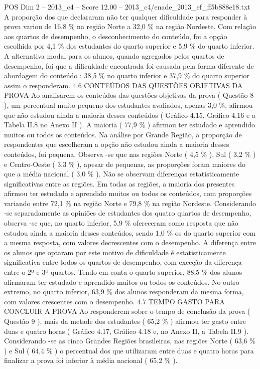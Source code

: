 \begin{textsample}{POS Dim 2 – 2013\_c4 – Score 12.00 – 2013\_c4/enade\_2013\_ef\_ff5b888e18.txt}
A proporção dos que declararam não ter qualquer dificuldade para responder à prova variou de 16,8 \% na região Norte a 32,0 \% na região Nordeste.
Com relação aos quartos de desempenho, o desconhecimento do conteúdo, foi a opção escolhida por 4,1 \% dos estudantes do quarto superior e 5,9 \% do quarto inferior.
A alternativa modal para os alunos, quando agregados pelos quartos de desempenho, foi que a dificuldade encontrada foi causada pela forma diferente de abordagem do conteúdo : 38,5 \% no quarto inferior e 37,9 \% do quarto superior assim o responderam. 4.6 CONTEÚDOS DAS QUESTÕES OBJETIVAS DA PROVA Ao analisarem os conteúdos das questões objetivas da prova ( Questão 8 ), um percentual muito pequeno dos estudantes avaliados, apenas 3,0 \%, afirmou que não estudou ainda a maioria desses conteúdos ( Gráfico 4.15, Gráfico 4.16 e a Tabela II.8 no Anexo II ).
A maioria ( 77,9 \% ) afirmou ter estudado e aprendido muitos ou todos os conteúdos.
Na análise por Grande Região, a proporção de respondentes que escolheram a opção não estudou ainda a maioria desses conteúdos, foi pequena.
Observa -se que nas regiões Norte ( 4,5 \% ), Sul ( 3,2 \% ) e Centro-Oeste ( 3,3 \% ), apesar de pequenas, as proporções foram maiores do que a média nacional ( 3,0 \% ).
Não se observam diferenças estatisticamente significativas entre as regiões.
Em todas as regiões, a maioria dos presentes afirmou ter estudado e aprendido muitos ou todos os conteúdos, com proporções variando entre 72,1 \% na região Norte e 79,8 \% na região Nordeste.
Considerando -se separadamente as opiniões de estudantes dos quatro quartos de desempenho, observa -se que, no quarto inferior, 5,9 \% ofereceram como resposta que não estudou ainda a maioria desses conteúdos, sendo 1,0 \% os do quarto superior com a mesma resposta, com valores decrescentes com o desempenho.
A diferença entre os alunos que optaram por este motivo de dificuldade é estatisticamente significativa entre todos os quartos de desempenho, com exceção da diferença entre o 2º e 3º quartos.
Tendo em conta o quarto superior, 88,5 \% dos alunos afirmaram ter estudado e aprendido muitos ou todos os conteúdos.
No outro extremo, no quarto inferior, 63,9 \% dos alunos responderam da mesma forma, com valores crescentes com o desempenho. 4.7 TEMPO GASTO PARA CONCLUIR A PROVA Ao responderem sobre o tempo de conclusão da prova ( Questão 9 ), mais da metade dos estudantes ( 65,2 \% ) afirmou ter gasto entre duas e quatro horas ( Gráfico 4.17, Gráfico 4.18 e, no Anexo II, a Tabela II.9 ).
Considerando -se as cinco Grandes Regiões brasileiras, nas regiões Norte ( 63,6 \% ) e Sul ( 64,4 \% ) o percentual dos que utilizaram entre duas e quatro horas para finalizar a prova foi inferior à média nacional ( 65,2 \% ).

\end{textsample}
